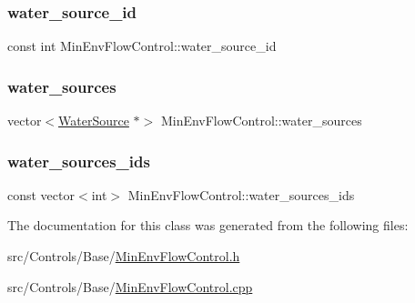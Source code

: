\subsubsection{\texorpdfstring{water\+\_\+source\+\_\+id}{water\_source\_id}}
{\footnotesize\ttfamily const int Min\+Env\+Flow\+Control\+::water\+\_\+source\+\_\+id}

\mbox{\label{classMinEnvFlowControl_a36b50d0e6887b956051ae53bf5d2e3a9_a36b50d0e6887b956051ae53bf5d2e3a9}} 
\subsubsection{\texorpdfstring{water\+\_\+sources}{water\_sources}}
{\footnotesize\ttfamily vector$<$\mbox{\hyperlink{classWaterSource}{Water\+Source}} $\ast$$>$ Min\+Env\+Flow\+Control\+::water\+\_\+sources\hspace{0.3cm}{\ttfamily [protected]}}

\mbox{\label{classMinEnvFlowControl_a775d6408e5c581754ee4240eea68abdc_a775d6408e5c581754ee4240eea68abdc}} 
\subsubsection{\texorpdfstring{water\+\_\+sources\+\_\+ids}{water\_sources\_ids}}
{\footnotesize\ttfamily const vector$<$int$>$ Min\+Env\+Flow\+Control\+::water\+\_\+sources\+\_\+ids}



The documentation for this class was generated from the following files\+:\begin{DoxyCompactItemize}
\item 
src/\+Controls/\+Base/\mbox{\hyperlink{MinEnvFlowControl_8h}{Min\+Env\+Flow\+Control.\+h}}\item 
src/\+Controls/\+Base/\mbox{\hyperlink{MinEnvFlowControl_8cpp}{Min\+Env\+Flow\+Control.\+cpp}}\end{DoxyCompactItemize}
